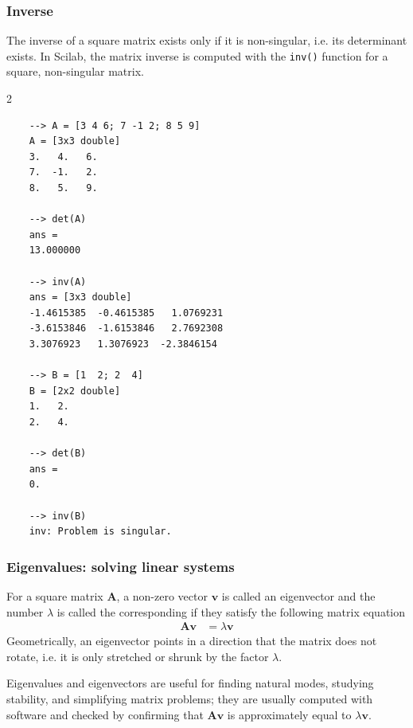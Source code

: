 \subsubsection{Inverse}
The inverse of a square matrix exists only if it is non-singular, i.e. its determinant exists. In Scilab, the matrix inverse is computed with the \verb|inv()| function for a square, non-singular matrix.
\begin{multicols}{2}
	\begin{verbatim}
	--> A = [3 4 6; 7 -1 2; 8 5 9]
	A = [3x3 double]
	3.   4.   6.
	7.  -1.   2.
	8.   5.   9.
	
	--> det(A)
	ans = 
	13.000000
	
	--> inv(A)
	ans = [3x3 double]
	-1.4615385  -0.4615385   1.0769231
	-3.6153846  -1.6153846   2.7692308
	3.3076923   1.3076923  -2.3846154
	
	--> B = [1  2; 2  4]
	B = [2x2 double]
	1.   2.
	2.   4.
	
	--> det(B)
	ans = 
	0.
	
	--> inv(B)
	inv: Problem is singular.
	\end{verbatim}
\end{multicols}

\subsubsection{Eigenvalues: solving linear systems}
For a square matrix $\boldsymbol{A}$, a non-zero vector $\boldsymbol{v}$ is called an eigenvector and the number $\lambda$ is called the corresponding if they satisfy the following matrix equation
\begin{align*}
	\boldsymbol{Av}&=\lambda\boldsymbol{v}
\end{align*}
Geometrically, an eigenvector points in a direction that the matrix does not rotate, i.e. it is only stretched or shrunk by the factor $\lambda$.

Eigenvalues and eigenvectors are useful for finding natural modes, studying stability, and simplifying matrix problems; they are usually computed with software and checked by confirming that $\boldsymbol{Av}$ is approximately equal to $\lambda\boldsymbol{v}$.

